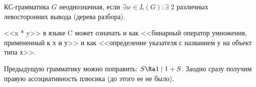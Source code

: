 \begin{Def}
КС-грамматика $G$ неоднозначная, если $\exists w \in L(G) \colon \exists$ 2 различных левосторонних вывода (дерева разбора).
\end{Def}
\begin{exmp}
<<x * y>> в языке C может означать и как <<бинарный оператор умножения, примененный к х и у>> и как <<определение указателя с названием у на объект типа х>>.

Предыдущую грамматику можно поправить: $S \Ra 1 \mid 1+S$. Заодно сразу получим правую ассоциативность плюсика (до этого ее не было).
\end{exmp}                                        
